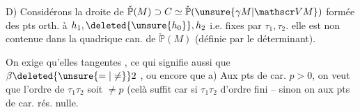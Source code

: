 D) Considérons la droite  de $\check{\mathbb P}(M)\supset C\simeq\check{\mathbb P}(\unsure{\gamma M|\mathscr V M})$ formée des pts orth. à $h_1,\deleted{\unsure{h_0}},h_2$ i.e. fixes par $\tau_1,\tau_2$.   elle est non contenue dans la quadrique can. de $\check{\mathbb P}(M)$ (définie par le déterminant).

On exige qu'elles    tangentes , ce qui signifie aussi que $\beta\deleted{\unsure{=|\ne}}2$ , ou encore que a) Aux pts  de car. $p>0$,  on veut que l'ordre de $\tau_1\tau_2$ soit $\ne p$ (celà suffit  car si $\tau_1\tau_2$ d'ordre fini -- sinon on  aux pts de car. rés. nulle.
